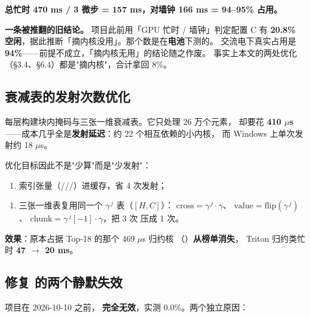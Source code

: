 \documentclass[11pt,openany]{ctexart}
\begin{document}
\textbf{总忙时 470 ms / 3 微步 = 157 ms，对墙钟 166 ms = 94–95\% 占用。}

\begin{notebox}
\textbf{一条被推翻的旧结论。} 项目此前用「GPU 忙时 / 墙钟」判定配置 C 有 \textbf{20.8\% 空闲}，据此推断「摘内核没用」。那个数是在\textbf{电池}下测的。 交流电下真实占用是 \textbf{94\%}——前提不成立，「摘内核无用」的结论随之作废。 事实上本文的两处优化（§3.4、§6.4）都是"摘内核"，合计拿回 8\%。
\end{notebox}

\subsection{衰减表的发射次数优化}

 每层构建块内掩码与三张一维衰减表。它只处理 26 万个元素， 却要花 \textbf{410 $\mu$s}——成本几乎全是\textbf{发射延迟}：约 22 个相互依赖的小内核， 而 Windows 上单次发射约 18 $\mu$s。

优化目标因此不是"少算"而是"少发射"：

\begin{enumerate}
  \item 索引张量（///）进缓存，省 4 次发射；
\end{enumerate}
\begin{enumerate}
  \item 三张一维表复用同一个 $\gamma^{\,j}$ 表（$[H,C]$）： $\text{cross} = \gamma^{\,j}\cdot\gamma$、 $\text{value} = \text{flip}(\gamma^{\,j})$、 $\text{chunk} = \gamma^{\,j}[-1]\cdot\gamma$，把 3 次  压成 1 次。
\end{enumerate}

\textbf{效果}：原本占据 Top-18 的那个 469 $\mu$s 归约核 （）\textbf{从榜单消失}， Triton 归约类忙时 \textbf{47 $\rightarrow$ 20 ms}。

\subsection{修复  的两个静默失效}

项目在 2026-10-10 之前， \textbf{完全无效}，实测 0.0\%。两个独立原因：
\end{document}
